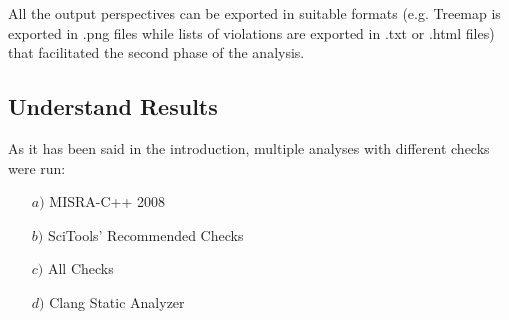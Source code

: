 All the output perspectives can be exported in suitable formats (e.g. Treemap is exported in .png files while lists of violations are exported in .txt or .html files) that facilitated the second phase of the analysis.

\subsection{Understand Results}

As it has been said in the introduction, multiple analyses with different checks were run:
\begin{itemize}
	\item[$a)$] MISRA-C++ 2008
	\item[$b)$] SciTools' Recommended Checks
	\item[$c)$] All Checks
	\item[$d)$] Clang Static Analyzer
\end{itemize}

